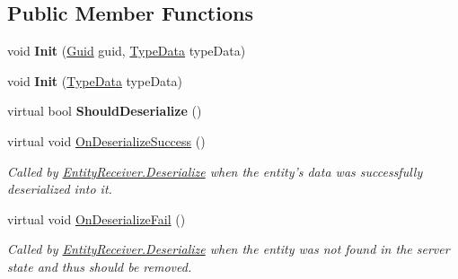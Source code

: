 \subsection*{Public Member Functions}
\begin{DoxyCompactItemize}
\item 
\hypertarget{class_skyrates_1_1_common_1_1_entity_1_1_entity_a5cacb91a3691f5a6c4b3087c98f402f9}{void {\bfseries Init} (\hyperlink{class_skyrates_1_1_common_1_1_entity_1_1_entity_ae32af79e6a33bed16aeb0455078885c8}{Guid} guid, \hyperlink{class_skyrates_1_1_common_1_1_entity_1_1_type_data}{Type\-Data} type\-Data)}\label{class_skyrates_1_1_common_1_1_entity_1_1_entity_a5cacb91a3691f5a6c4b3087c98f402f9}

\item 
\hypertarget{class_skyrates_1_1_common_1_1_entity_1_1_entity_a1e1f4bba9e46f3753dda54a9db711a06}{void {\bfseries Init} (\hyperlink{class_skyrates_1_1_common_1_1_entity_1_1_type_data}{Type\-Data} type\-Data)}\label{class_skyrates_1_1_common_1_1_entity_1_1_entity_a1e1f4bba9e46f3753dda54a9db711a06}

\item 
\hypertarget{class_skyrates_1_1_common_1_1_entity_1_1_entity_aa207bcb5c4e7ac19983bee537dfee751}{virtual bool {\bfseries Should\-Deserialize} ()}\label{class_skyrates_1_1_common_1_1_entity_1_1_entity_aa207bcb5c4e7ac19983bee537dfee751}

\item 
virtual void \hyperlink{class_skyrates_1_1_common_1_1_entity_1_1_entity_aa5a53dfb527054cd23f69bc8750f59e0}{On\-Deserialize\-Success} ()
\begin{DoxyCompactList}\small\item\em Called by \hyperlink{class_skyrates_1_1_common_1_1_entity_1_1_entity_receiver_a9da0b7c3a8b9e1ed7d10be74ce80482b}{Entity\-Receiver.\-Deserialize} when the entity's data was successfully deserialized into it. \end{DoxyCompactList}\item 
virtual void \hyperlink{class_skyrates_1_1_common_1_1_entity_1_1_entity_a8cf85f4ac28cf907926eef27148e5124}{On\-Deserialize\-Fail} ()
\begin{DoxyCompactList}\small\item\em Called by \hyperlink{class_skyrates_1_1_common_1_1_entity_1_1_entity_receiver_a9da0b7c3a8b9e1ed7d10be74ce80482b}{Entity\-Receiver.\-Deserialize} when the entity was not found in the server state and thus should be removed. \end{DoxyCompactList}\end{DoxyCompactItemize}
